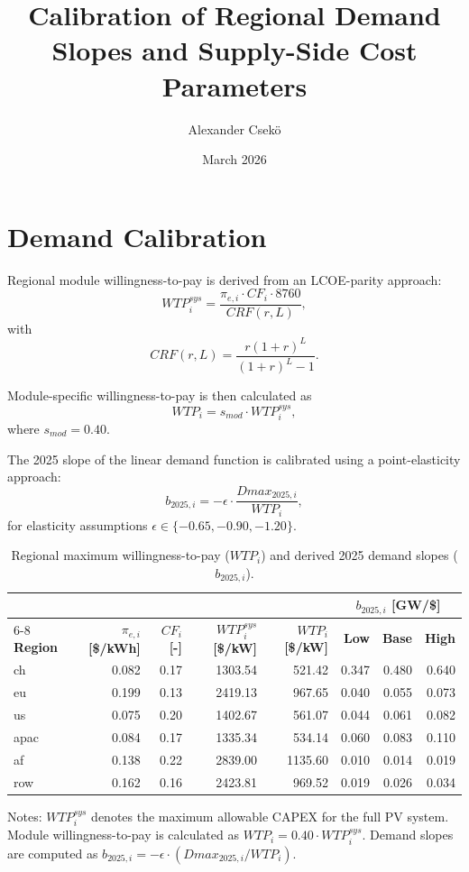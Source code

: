 \documentclass[11pt,a4paper]{article}
\title{\textbf{Calibration of Regional Demand Slopes and Supply-Side Cost Parameters}}
\author{Alexander Csekö}
\date{March 2026}
\begin{document}
\maketitle

\section{Demand Calibration}

Regional module willingness-to-pay is derived from an LCOE-parity approach:
\begin{equation}
WTP_i^{sys} = \frac{\pi_{e,i} \cdot CF_i \cdot 8760}{CRF(r,L)},
\end{equation}
with
\begin{equation}
CRF(r,L) = \frac{r(1+r)^L}{(1+r)^L - 1}.
\end{equation}

Module-specific willingness-to-pay is then calculated as
\begin{equation}
WTP_i = s_{mod} \cdot WTP_i^{sys},
\end{equation}
where $s_{mod}=0.40$.

The 2025 slope of the linear demand function is calibrated using a point-elasticity approach:
\begin{equation}
b_{2025,i} = -\epsilon \cdot \frac{Dmax_{2025,i}}{WTP_i},
\end{equation}
for elasticity assumptions $\epsilon \in \{-0.65,-0.90,-1.20\}$.

\begin{table}[ht]
\centering
\caption{Regional maximum willingness-to-pay ($WTP_i$) and derived 2025 demand slopes ($b_{2025,i}$).}
\label{tab:wtp_and_slopes}
\begin{tabular}{lrrrrrrr}
\toprule
& & & & & \multicolumn{3}{c}{$b_{2025,i}$ [GW/\$]} \\
\cmidrule(lr){6-8}
\textbf{Region} &
\textbf{$\pi_{e,i}$ [\$/kWh]} &
\textbf{$CF_i$ [-]} &
\textbf{$WTP_i^{sys}$ [\$/kW]} &
\textbf{$WTP_i$ [\$/kW]} &
\textbf{Low} &
\textbf{Base} &
\textbf{High} \\
\midrule
ch   & 0.082 & 0.17 & 1303.54 & 521.42  & 0.347 & 0.480 & 0.640 \\
eu   & 0.199 & 0.13 & 2419.13 & 967.65  & 0.040 & 0.055 & 0.073 \\
us   & 0.075 & 0.20 & 1402.67 & 561.07  & 0.044 & 0.061 & 0.082 \\
apac & 0.084 & 0.17 & 1335.34 & 534.14  & 0.060 & 0.083 & 0.110 \\
af   & 0.138 & 0.22 & 2839.00 & 1135.60 & 0.010 & 0.014 & 0.019 \\
row  & 0.162 & 0.16 & 2423.81 & 969.52  & 0.019 & 0.026 & 0.034 \\
\bottomrule
\end{tabular}

\vspace{0.6em}
\footnotesize
Notes: $WTP_i^{sys}$ denotes the maximum allowable CAPEX for the full PV system. Module willingness-to-pay is calculated as $WTP_i = 0.40 \cdot WTP_i^{sys}$. Demand slopes are computed as $b_{2025,i} = -\epsilon \cdot (Dmax_{2025,i}/WTP_i)$.
\end{table}
\end{document}
